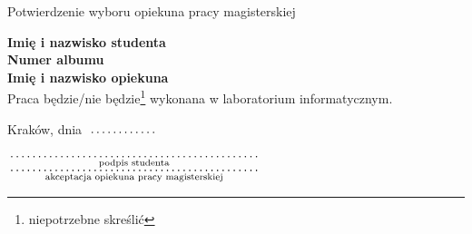 \documentclass[a4paper,11pt]{article}
\newcommand{\fillField}[2]{
    $\underset{\text{#1}}{\parbox[t]{#2}{\dotfill}}$
}
\begin{document}
\begin{center}
    \huge Potwierdzenie wyboru opiekuna pracy magisterskiej
\end{center}
\vskip 2cm

\noindent \textbf{Imię i nazwisko studenta} \dotfill \\
\textbf{Numer albumu} \dotfill \\
\textbf{Imię i nazwisko opiekuna} \dotfill \\

\noindent Praca będzie/nie będzie\footnote{niepotrzebne skreślić} wykonana w laboratorium informatycznym.
\vskip 2cm

\noindent Kraków, dnia \fillField{}{2cm}
\vskip 1cm
\begin{justify}
\noindent \fillField{podpis studenta}{7cm} \hskip 1.5cm \fillField{akceptacja opiekuna pracy magisterskiej}{7cm}
\end{justify}
\end{document}
